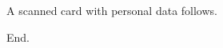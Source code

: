 \documentclass[11pt,a4paper]{article}
\begin{document}
A scanned card with personal data follows.

\begin{figure}[h]
\end{figure}

End.
\end{document}
